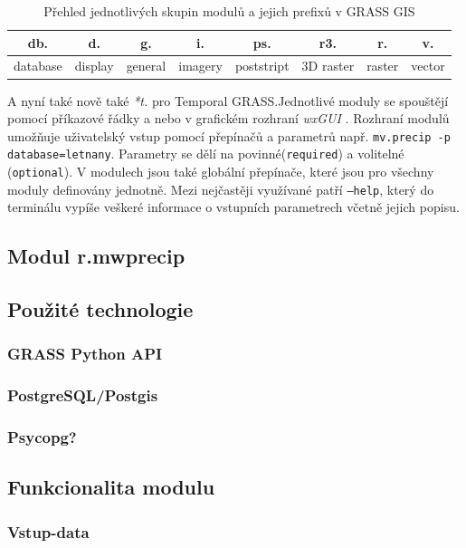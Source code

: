 \documentclass[a4paper,12pt]{article}
\begin{document}
\begin{table}[h]
\centering
\begin{tabular}{cccccccc}
\hline
db. & d. & g. & i. & ps. & r3. & r. & v. \\ \hline
database & display & general & imagery & poststript & 3D raster & raster & vector
\end{tabular}
\caption{Přehled jednotlivých skupin modulů a jejich prefixů v GRASS GIS}
\label{tab:module}
\end{table}


A nyní také nově také \textit{*t.} pro Temporal GRASS.Jednotlivé moduly se spouštějí pomocí příkazové řádky a nebo v grafickém rozhraní \textit{wxGUI} . Rozhraní modulů umožňuje uživatelský vstup pomocí přepínačů a parametrů např. \texttt{mv.precip -p database=letnany}. Parametry se dělí na povinné(\texttt{required}) a volitelné (\texttt{optional}). V modulech jsou také globální přepínače, které jsou pro všechny moduly definovány jednotně. Mezi nejčastěji využívané patří \texttt{--help}, který do terminálu vypíše veškeré informace o vstupních parametrech včetně jejich  popisu.

\subsection{Modul r.mwprecip} 
\subsection{Použité technologie}

\subsubsection{GRASS Python API}
\subsubsection{PostgreSQL/Postgis}
\subsubsection{Psycopg?}

\subsection{Funkcionalita modulu}
\subsubsection{Vstup-data}   
\end{document}
